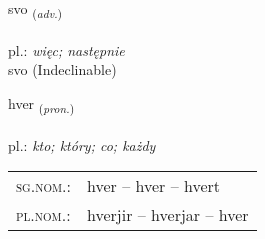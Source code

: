 \documentclass[frontgrid, backgrid]{flacards}\usepackage[]{graphicx}\usepackage[]{xcolor}
\begin{document}
\renewcommand{\blhead}{\vskip5pt {\small\bfseries\footnotesize Atviksorð | przysłówek }}
\renewcommand{\bcfoot}{\vskip5pt \hspace{2pt}{\small\bfseries\footnotesize 1K}}


{svo \small{\textsubscript{(\textit{adv.})}} \\[1ex]
\textphonetic{[svɔː]} \\
pl.: \emph{więc; następnie} \\  [2ex]
svo (Indeclinable)}

\renewcommand{\flhead}{\vskip5pt \fboxsep=0pt {\small\bfseries\footnotesize Fornafn | zaimek}}
\renewcommand{\fcfoot}{\vskip5pt \fboxsep=0pt \hspace{2pt}{\small\bfseries\footnotesize 1K}}

\renewcommand{\blhead}{\vskip5pt {\small\bfseries\footnotesize Fornafn | zaimek }}
\renewcommand{\bcfoot}{\vskip5pt \hspace{2pt}{\small\bfseries\footnotesize 1K}}


{hver \small{\textsubscript{(\textit{pron.})}} \\[1ex] %
\textphonetic{[kʰvɛr]} \\
pl.: \emph{kto; który; co; każdy} \\  [2ex]
\renewcommand*{\arraystretch}{0.8}
\begin{tabular}{ll}
\textsc{sg.nom.}: & hver  --  hver -- hvert \\ 
\textsc{pl.nom.}: & hverjir -- hverjar -- hver
\end{tabular}
}

\renewcommand{\flhead}{\vskip5pt \fboxsep=0pt {\small\bfseries\footnotesize Sagnorð | czasownik}}
\renewcommand{\fcfoot}{\vskip5pt \fboxsep=0pt \hspace{2pt}{\small\bfseries\footnotesize 1K}}

\renewcommand{\blhead}{\vskip5pt {\small\bfseries\footnotesize Sagnorð | czasownik }}
\renewcommand{\bcfoot}{\vskip5pt \hspace{2pt}{\small\bfseries\footnotesize 1K}}
\end{document}
